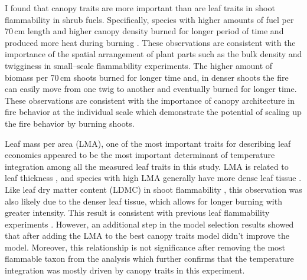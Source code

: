 \documentclass{ttuthes2007}
\begin{document}
I found that canopy traits are more important than are leaf traits in shoot flammability in shrub fuels. %
Specifically, species with higher amounts of fuel per 70\,cm length and higher canopy density burned for longer period of time and produced more heat during burning . These observations are consistent with the importance of the spatial arrangement of plant parts such as the bulk density \citep{pausas2012firesulex} and twigginess \citep{potts2022growth} in small--scale flammability experiments. The higher amount of biomass per 70\,cm shoots burned for longer time and, in denser shoots the fire can easily move from one twig to another and eventually burned for longer time. These observations are  consistent with the importance of canopy architecture in fire behavior at the individual scale \citep{madrigal2012evaluation} which demonstrate the potential of scaling up the fire behavior by burning shoots.





Leaf mass per area (LMA), one of the most important traits for describing leaf economics %
\citep{wright2004worldwide} appeared to be the most important determinant of temperature integration among all the measured leaf traits in this study. LMA is related to leaf thickness \citep{niinemets1999research}, and species with high LMA generally have more dense leaf tissue \citep{poorter2009causes}. Like leaf dry matter content (LDMC) in shoot flammability \citep{alam2020shoot, potts2022growth}, this observation
was also likely due to the denser leaf tissue, which allows for longer burning with greater intensity. This result is consistent with previous leaf flammability experiments \citep{krix2018landscape}.
However, an additional step in the model selection results showed that after adding the LMA to the best canopy traits model didn't improve the model.
Moreover, this relationship is not significance %
after removing the most flammable taxon from the analysis which further confirms that the temperature integration was mostly driven by canopy traits in this experiment.\\
\end{document}
